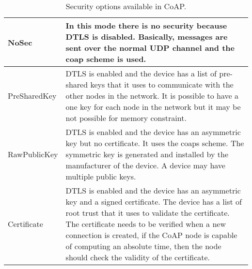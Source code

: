 	\begin{table}[h!]
		\begin{center}
			\begin{tabularx}{\textwidth}{|l|X|}
				\hline
				NoSec & In this mode there is no security because DTLS is disabled.
				Basically, messages are sent over the normal UDP channel and the coap scheme is used.\\\hline
				PreSharedKey & DTLS is enabled and the device has a list of pre-shared keys that it uses to communicate with the other nodes in the network.
				It is possible to have a one key for each node in the network but it may be not possible for memory constraint.\\\hline
				RawPublicKey & DTLS is enabled and the device has an asymmetric key but no certificate.
				It uses the coaps scheme.
				The symmetric key is generated and installed by the manufacturer of the device.
				A device may have multiple public keys.\\\hline
				Certificate & DTLS is enabled and the device has an asymmetric key and a signed certificate.
				The device has a list of root trust that it uses to validate the certificate.
				The certificate needs to be verified when a new connection is created, if the CoAP node is capable of computing an absolute time, then the node should check the validity of the certificate.
				\\\hline
				
				
			\end{tabularx}
			\caption{Security options available in CoAP.}
			\label{tab:table10}
		\end{center}
	\end{table}